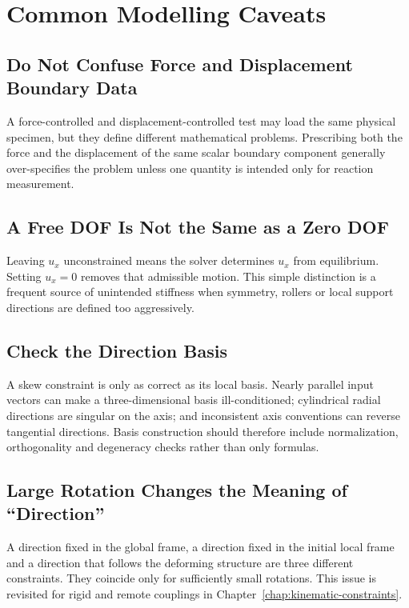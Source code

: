 \section{Common Modelling Caveats}

\subsection{Do Not Confuse Force and Displacement Boundary Data}

A force-controlled and displacement-controlled test may load the same physical
specimen, but they define different mathematical problems. Prescribing both the
force and the displacement of the same scalar boundary component generally
over-specifies the problem unless one quantity is intended only for reaction
measurement.

\subsection{A Free DOF Is Not the Same as a Zero DOF}

Leaving $u_x$ unconstrained means the solver determines $u_x$ from equilibrium.
Setting $u_x=0$ removes that admissible motion. This simple distinction is a
frequent source of unintended stiffness when symmetry, rollers or local support
directions are defined too aggressively.

\subsection{Check the Direction Basis}

A skew constraint is only as correct as its local basis. Nearly parallel input
vectors can make a three-dimensional basis ill-conditioned; cylindrical radial
directions are singular on the axis; and inconsistent axis conventions can
reverse tangential directions. Basis construction should therefore include
normalization, orthogonality and degeneracy checks rather than only formulas.

\subsection{Large Rotation Changes the Meaning of ``Direction''}

A direction fixed in the global frame, a direction fixed in the initial local
frame and a direction that follows the deforming structure are three different
constraints. They coincide only for sufficiently small rotations. This issue is
revisited for rigid and remote couplings in
Chapter~\ref{chap:kinematic-constraints}.

